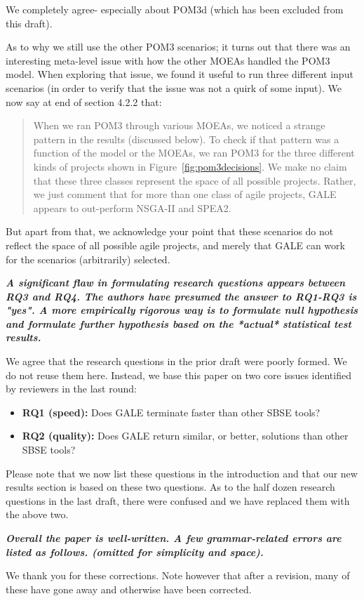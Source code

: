 \documentclass[10pt,journal,compsoc]{IEEEtran}
\newcommand{\bi}{\begin{itemize}}
\newcommand{\ei}{\end{itemize}}
\newcommand{\fig}[1]{Figure~\ref{fig:#1}}
\begin{document}
We completely agree- especially about POM3d (which
has been excluded from this draft).

As to why we still use the other POM3 scenarios; it
turns out that there was an interesting meta-level
issue with how the other MOEAs handled the POM3
model. When exploring that issue, we found it useful to
run three different input scenarios (in order to
verify that the issue was not a quirk of some
input). We now say at end of section 4.2.2 that:
\begin{quote}
When we ran POM3 through various MOEAs, we noticed a strange pattern in the results
(discussed below). To check if that pattern was a function of the model or the MOEAs,
we ran POM3 for the three different kinds of projects shown in \fig{pom3decisions}.
We make no claim that these three classes represent the space of all possible projects.
Rather, we just comment that for more than one class of agile projects,
GALE appears to out-perform NSGA-II and SPEA2.
\end{quote}
 But apart from that, we acknowledge your point
 that these scenarios do not reflect the
 space of all possible agile projects, and merely that
 GALE can work for the scenarios (arbitrarily) selected.

{\bf {\em  A significant flaw in formulating research
    questions appears between RQ3 and RQ4. The
    authors have presumed the answer to RQ1-RQ3 is
    "yes". A more empirically rigorous way is to
    formulate null hypothesis and formulate further
    hypothesis based on the *actual* statistical
    test results.}}

We agree that the research questions in the prior draft were poorly formed. We do not reuse them here.  Instead, we base this
paper on two core issues identified by reviewers in the last round:
\bi
\item
{\bf RQ1 (speed):} Does GALE terminate faster than other SBSE tools?
\item 
{\bf RQ2 (quality):} Does GALE return  similar, or better,
solutions than other SBSE tools?
\ei
Please note that we now list these questions in the introduction and that our
new results section is based on these two questions.
As to the half dozen research questions in the last draft, there were confused and
we have replaced them with the above two.


{\bf {\em
Overall the paper is well-written. A few grammar-related errors are listed as follows.
(omitted for simplicity and space).}}

We thank you for these corrections.  Note however that after a revision, many of these
have gone away and otherwise have been corrected.
\end{document}
